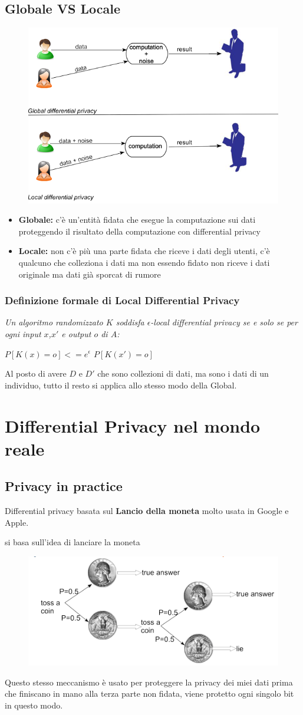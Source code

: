 \documentclass{report}
\begin{document}
\section{Globale VS Locale}
\begin{figure}[H]
        \centering
        \includegraphics[width=0.3\linewidth]{images/Gloabl.png}
\end{figure}
\begin{itemize}
    \item \textbf{Globale:} c'è un'entità fidata che esegue la computazione sui dati proteggendo il risultato della computazione con differential privacy
    \item \textbf{Locale:} non c'è più una parte fidata che riceve i dati degli utenti, c'è qualcuno che colleziona i dati ma non essendo fidato non riceve i dati originale ma dati già sporcat di rumore
\end{itemize}

\subsection{Definizione formale di Local Differential Privacy}
\textit{Un algoritmo randomizzato $K$ soddisfa $\epsilon$-local differential privacy
se e solo se per ogni input $x$,$x'$ e output $o$ di $A$:}
\begin{center}
    \textit{$P[K(x) = o]<= e^\epsilon$ $P[K(x') = o]$}
\end{center}

\noindent Al posto di avere $D$ e $D'$ che sono collezioni di dati, ma sono i dati di un individuo, tutto il resto si applica allo stesso modo della Global.

\chapter{Differential Privacy nel mondo reale}
\section{Privacy in practice}
Differential privacy basata sul \textbf{Lancio della moneta} molto usata in Google e Apple.

\noindent si basa sull'idea di lanciare la moneta
\begin{figure}[H]
        \centering
        \includegraphics[width=0.3\linewidth]{images/coin.png}
\end{figure}
\noindent Questo stesso meccanismo è usato per proteggere la privacy dei miei dati prima che finiscano in mano alla terza parte non fidata,
viene protetto ogni singolo bit in questo modo. 
\end{document}

